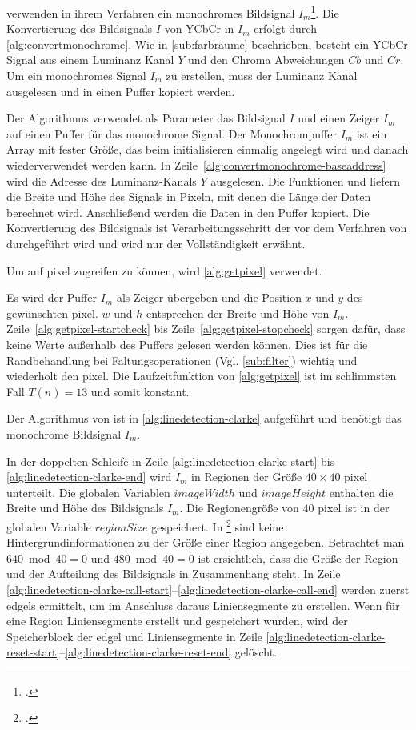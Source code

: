 \citeauthor{clarke96} verwenden in ihrem Verfahren ein monochromes Bildsignal $I_m$\footcite[Vgl.][S.~417]{clarke96}.
 Die Konvertierung des Bildsignals $I$ von YCbCr in $I_m$ erfolgt durch \autoref{alg:convertmonochrome}. Wie in
 \autoref{sub:farbräume} beschrieben, besteht ein YCbCr Signal aus einem Luminanz Kanal $Y$ und den Chroma Abweichungen
 $Cb$ und $Cr$. Um ein monochromes Signal $I_m$ zu erstellen, muss der Luminanz Kanal ausgelesen und in einen Puffer
 kopiert werden.

Der Algorithmus verwendet als Parameter das Bildsignal $I$ und einen Zeiger $I_m$ auf einen Puffer für das monochrome
 Signal. Der Monochrompuffer $I_m$ ist ein Array mit fester Größe, das beim initialisieren einmalig angelegt wird und
 danach wiederverwendet werden kann. In Zeile~\ref{alg:convertmonochrome-baseaddress} wird die Adresse des
 Luminanz-Kanals $Y$ ausgelesen. Die Funktionen  und  liefern die Breite und Höhe des
 Signals in Pixeln, mit denen die Länge der Daten berechnet wird. Anschließend werden die Daten in den Puffer kopiert.
 Die Konvertierung des Bildsignals ist Verarbeitungsschritt der vor dem Verfahren von \citeauthor{clarke96} durchgeführt
 wird und wird nur der Vollständigkeit erwähnt.

Um auf \gls{pixel} zugreifen zu können, wird \autoref{alg:getpixel} verwendet.

Es wird der Puffer $I_m$ als Zeiger übergeben und die Position $x$ und $y$ des gewünschten \gls{pixel}. $w$ und $h$
 entsprechen der Breite und Höhe von $I_m$. Zeile~\ref{alg:getpixel-startcheck} bis Zeile~\ref{alg:getpixel-stopcheck}
 sorgen dafür, dass keine Werte außerhalb des Puffers gelesen werden können. Dies ist für die Randbehandlung bei
 Faltungsoperationen (Vgl. \autoref{sub:filter}) wichtig und wiederholt den \gls{pixel}. Die Laufzeitfunktion von
 \autoref{alg:getpixel} ist im schlimmsten Fall $T(n) = 13$ und somit konstant.

Der Algorithmus von \citeauthor{clarke96} ist in \autoref{alg:linedetection-clarke} aufgeführt und benötigt das
 monochrome Bildsignal $I_m$.

In der doppelten Schleife in Zeile \ref{alg:linedetection-clarke-start} bis \ref{alg:linedetection-clarke-end} wird
 $I_m$ in Regionen der Größe $40 \times 40$ \gls{pixel} unterteilt. Die globalen Variablen $\mathit{imageWidth}$ und
 $\mathit{imageHeight}$ enthalten die Breite und Höhe des Bildsignals $I_m$. Die Regionengröße von $40$ \gls{pixel} ist
 in der globalen Variable $\mathit{regionSize}$ gespeichert. In \citeauthor{clarke96}\footcite{clarke96} sind keine
 Hintergrundinformationen zu der Größe einer Region angegeben. Betrachtet man $640 \bmod 40 = 0$ und $480 \bmod 40 = 0$
 ist ersichtlich, dass die Größe der Region und der Aufteilung des Bildsignals in Zusammenhang steht. In Zeile
 \ref{alg:linedetection-clarke-call-start}--\ref{alg:linedetection-clarke-call-end} werden zuerst \glspl{edgel}
 ermittelt, um im Anschluss daraus Liniensegmente zu erstellen. Wenn für eine Region Liniensegmente erstellt und
 gespeichert wurden, wird der Speicherblock der \gls{edgel} und Liniensegmente in Zeile
 \ref{alg:linedetection-clarke-reset-start}--\ref{alg:linedetection-clarke-reset-end} gelöscht.

